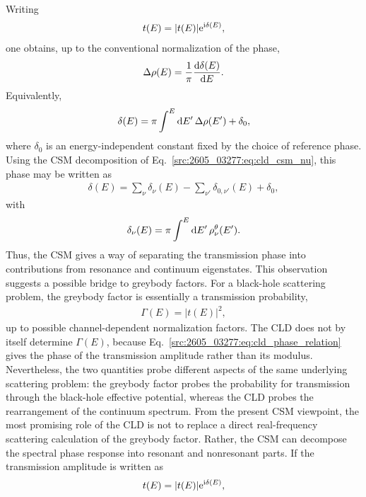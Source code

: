 Writing
\begin{align}
    t(E)=|t(E)|\mathrm{e}^{\mathrm{i} \delta(E)},
\end{align}
one obtains, up to the conventional normalization of the phase,
\begin{align}
    \Delta\rho(E)
    =
    \frac{1}{\pi}
    \frac{\mathrm{d} \delta(E)}{\mathrm{d} E}.
    \label{src:2605_03277:eq:cld_phase_relation}
\end{align}
Equivalently,
\begin{align}
    \delta(E)
    =
    \pi
    \int^E \mathrm{d} E'\,\Delta\rho(E')
    +
    \delta_0 ,
    \label{src:2605_03277:eq:phase_from_cld}
\end{align}
where $\delta_0$ is an energy-independent constant fixed by the choice of
reference phase.
Using the CSM decomposition of Eq.~\eqref{src:2605_03277:eq:cld_csm_nu}, this phase may be
written as
\begin{align}
    \delta(E)
    =
    \sum_\nu \delta_\nu(E)
    -
    \sum_{\nu'} \delta_{0,\nu'}(E)
    +
    \delta_0 ,
\end{align}
with
\begin{align}
    \delta_\nu(E)
    =
    \pi\int^E \mathrm{d} E'\,\rho^\theta_\nu(E').
\end{align}
Thus, the CSM gives a way of separating the transmission phase into
contributions from resonance and continuum eigenstates.
This observation suggests a possible bridge to greybody factors.
For a black-hole scattering problem, the greybody factor is essentially a
transmission probability,
\begin{align}
    \Gamma(E)=|t(E)|^2 ,
\end{align}
up to possible channel-dependent normalization factors.
The CLD does not by itself determine $\Gamma(E)$, because
Eq.~\eqref{src:2605_03277:eq:cld_phase_relation} gives the phase of the transmission
amplitude rather than its modulus.
Nevertheless, the two quantities probe different aspects of the same
underlying scattering problem:
the greybody factor probes the probability for transmission through the
black-hole effective potential, whereas the CLD probes the rearrangement of
the continuum spectrum.
From the present CSM viewpoint, the most promising role of the CLD is not to
replace a direct real-frequency scattering calculation of the greybody factor.
Rather, the CSM can decompose the spectral phase response into resonant and
nonresonant parts.
If the transmission amplitude is written as
\begin{align}
    t(E)
    =
    |t(E)|
    \mathrm{e}^{\mathrm{i} \delta(E)},
\end{align}
